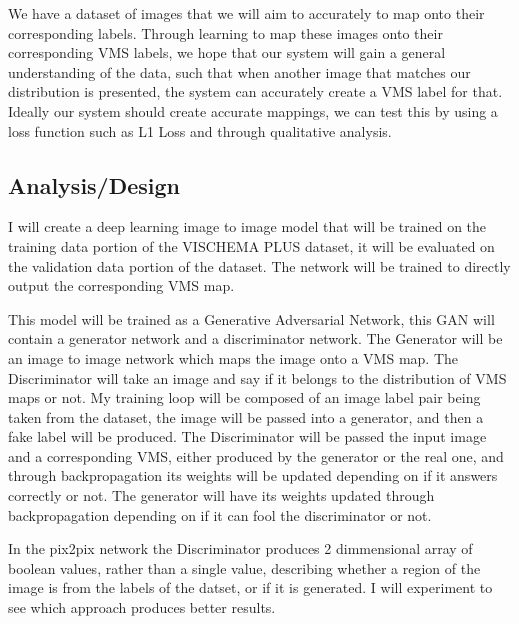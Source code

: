\documentclass{UoYCSproject}
\begin{document}
We have a dataset of images that we will aim to accurately to map onto their corresponding labels. Through learning to map these images onto their corresponding VMS labels, we hope that our system will gain a general understanding of the data, such that when another image that matches our distribution is presented, the system can accurately create a VMS label for that. Ideally our system should create accurate mappings, we can test this by using a loss function such as L1 Loss and through qualitative analysis. 

\subsection{Analysis/Design}


I will create a deep learning image to image model that will be trained on the training data portion of the VISCHEMA PLUS dataset, it will be evaluated on the validation data portion of the dataset. The network will be trained to directly output the corresponding VMS map.

This model will be trained as a Generative Adversarial Network, this GAN will contain a generator network and a discriminator network. The Generator will be an image to image network which maps the image onto a VMS map. The Discriminator will take an image and say if it belongs to the distribution of VMS maps or not. My training loop will be composed of an image label pair being taken from the dataset, the image will be passed into a generator, and then a fake label will be produced. The Discriminator will be passed the input image and a corresponding VMS, either produced by the generator or the real one, and through backpropagation its weights will be updated depending on if it answers correctly or not. The generator will have its weights updated through backpropagation depending on if it can fool the discriminator or not. 

In the pix2pix network the Discriminator produces 2 dimmensional array of boolean values, rather than a single value, describing whether a region of the image is from the labels of the datset, or if it is generated. I will experiment to see which approach produces better results. 

\end{document}
